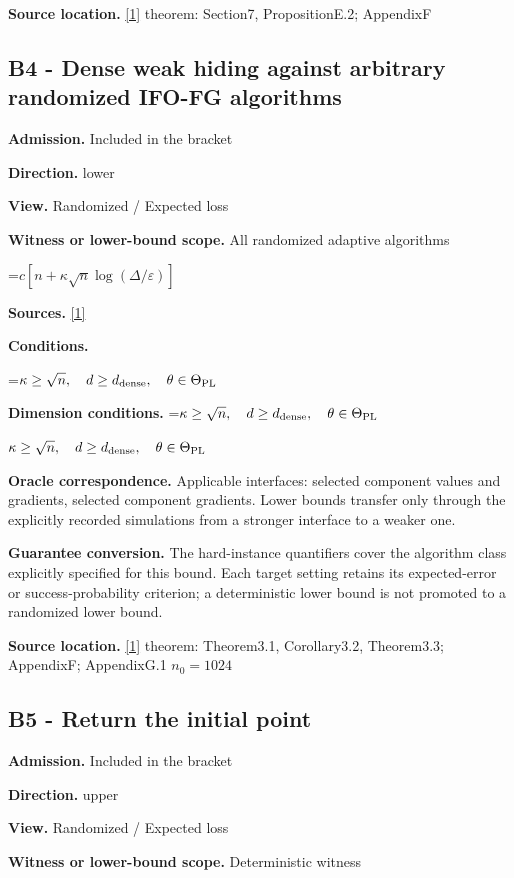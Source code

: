 \documentclass[10pt,a4paper]{article}
\newcommand{\AtlasMath}[1]{\par\begingroup\centering\setbox0=\hbox{$\displaystyle #1$}\ifdim\wd0>1.4\linewidth\typeout{ATLAS WIDE FORMULA: \the\wd0}\fi\ifdim\wd0>\linewidth\resizebox{\linewidth}{!}{\box0}\else\box0\fi\par\endgroup}
\newcommand{\AtlasInlineMath}[1]{\begingroup\setbox0=\hbox{$#1$}\ifdim\wd0>.4\linewidth\endgroup\AtlasMath{#1}\else\endgroup$#1$\fi}
\begin{document}
\textbf{Source location.} \href{https://arxiv.org/pdf/2609.00045v3}{[1]} theorem: Section7, PropositionE.2; AppendixF

\subsection{B4 - Dense weak hiding against arbitrary randomized IFO-FG algorithms}
\textbf{Admission.} Included in the bracket

\textbf{Direction.} lower

\textbf{View.} Randomized / Expected loss

\textbf{Witness or lower-bound scope.} All randomized adaptive algorithms

\AtlasMath{c[n+\kappa\sqrt n\log(\Delta/\varepsilon)]}
\textbf{Sources.} \href{https://arxiv.org/pdf/2609.00045v3}{[1]}

\textbf{Conditions.} 
\AtlasMath{\kappa\ge\sqrt n,\quad d\ge d_{\rm dense},\quad\theta\in\Theta_{\rm PL}}


\textbf{Dimension conditions.} \AtlasInlineMath{\kappa\ge\sqrt n,\quad d\ge d_{\rm dense},\quad\theta\in\Theta_{\rm PL}}

\textbf{Oracle correspondence.} Applicable interfaces: selected component values and gradients, selected component gradients. Lower bounds transfer only through the explicitly recorded simulations from a stronger interface to a weaker one.

\textbf{Guarantee conversion.} The hard-instance quantifiers cover the algorithm class explicitly specified for this bound. Each target setting retains its expected-error or success-probability criterion; a deterministic lower bound is not promoted to a randomized lower bound.

\textbf{Source location.} \href{https://arxiv.org/pdf/2609.00045v3}{[1]} theorem: Theorem3.1, Corollary3.2, Theorem3.3; AppendixF; AppendixG.1 $n_0=1024$

\subsection{B5 - Return the initial point}
\textbf{Admission.} Included in the bracket

\textbf{Direction.} upper

\textbf{View.} Randomized / Expected loss

\textbf{Witness or lower-bound scope.} Deterministic witness
\end{document}
